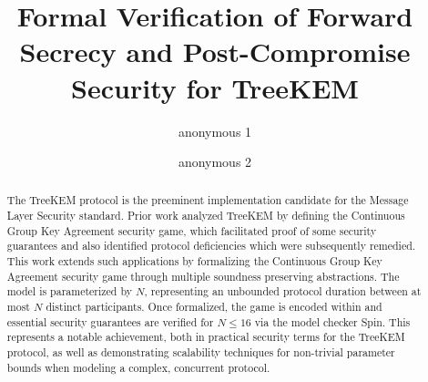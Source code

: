 \documentclass[authordraft,sigconf]{acmart}
\begin{document}
\title{Formal Verification of Forward Secrecy and Post-Compromise Security for TreeKEM}


\author{anonymous 1}
\author{anonymous 2}




\begin{abstract}
The TreeKEM protocol is the preeminent implementation candidate for the Message Layer Security standard.
Prior work analyzed TreeKEM by defining the Continuous Group Key Agreement security game,
which facilitated proof of some security guarantees and also identified protocol deficiencies which were subsequently remedied.
This work extends such applications by formalizing the Continuous Group Key Agreement security game through multiple soundness preserving abstractions.
The model is parameterized by $N$, representing an unbounded protocol duration between at most $N$ distinct participants.
Once formalized, the game is encoded within \Promela and essential security guarantees are verified for $N \le 16$ via the model checker Spin.
This represents a notable achievement, both in practical security terms for the TreeKEM protocol, as well as demonstrating scalability techniques for non-trivial parameter bounds when modeling a complex, concurrent protocol.
\end{abstract}
\end{document}
